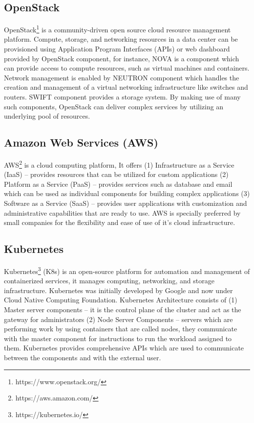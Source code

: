 \subsection{OpenStack}
\label{SecOpenStack}
OpenStack\footnote{https://www.openstack.org/} is a community-driven open source cloud resource management platform. Compute, storage, and networking resources in a data center can be provisioned using Application Program Interfaces (APIs) or web dashboard provided by OpenStack component, for instance, NOVA is a component which can provide access to compute resources, such as virtual machines and containers. Network management is enabled by NEUTRON component which handles the creation and management of a virtual networking infrastructure like switches and routers. SWIFT component provides a storage system. By making use of many such components, OpenStack can deliver complex services by utilizing an underlying pool of resources.
\subsection{Amazon Web Services (AWS)}
AWS\footnote{https://aws.amazon.com/} is a cloud computing platform, It offers (1) Infrastructure as a Service (IaaS) -- provides resources that can be utilized for custom applications (2) Platform as a Service (PaaS) -- provides services such as database and email which can be used as individual components for building complex applications (3) Software as a Service (SaaS) -- provides user applications with customization and administrative capabilities that are ready to use. AWS is specially preferred by small companies for the flexibility and ease of use of it's cloud infrastructure.
\subsection{Kubernetes}
\label{SecKubernetes}
Kubernetes\footnote{https://kubernetes.io/} (K8s) is an open-source platform for automation and management of containerized services, it manages computing, networking, and storage infrastructure. Kubernetes was initially developed by Google and now under Cloud Native Computing Foundation. Kubernetes Architecture consists of (1) Master server components -- it is the control plane of the cluster and act as the gateway for  administrators (2) Node Server Components -- servers which are performing work by using containers that are called nodes, they communicate with the master component for instructions to run the workload assigned to them. Kubernetes provides comprehensive APIs which are used to communicate between the components and with the external user.
